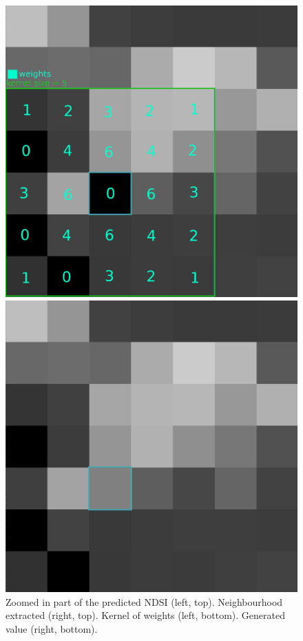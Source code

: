 \documentclass[12pt, a4paper]{report}
\begin{document}
\begin{figure}[h!]
\begin{minipage}{0.44\textwidth}
	\end{minipage}
	\begin{minipage}{0.44\textwidth}
		\centering
		\includegraphics[width=\linewidth]{../images/gaussian_weights.png}
	\end{minipage}
	\begin{minipage}{0.44\textwidth}
		\centering
		\includegraphics[width=\linewidth]{../images/gaussian_pixel.png}
	\end{minipage}
	\caption{Zoomed in part of the predicted NDSI (left, top). Neighbourhood extracted (right, top). Kernel of weights (left, bottom). Generated value (right, bottom).}
	\label{fig:gaussian}
	\end{figure}
	
\end{document}
